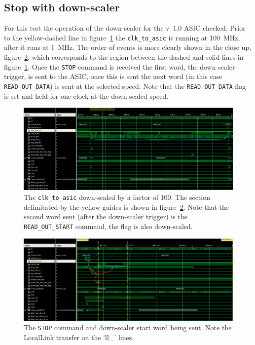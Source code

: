 \subsection{Stop with down-scaler} %
\label{sec:stop_downscaler}
For this test the operation of the down-scaler for the v~1.0 ASIC checked. Prior to the yellow-dashed line in figure~\ref{fig:isim_stop-downscaler} the \texttt{clk\_to\_asic} is running at 100~MHz, after it runs at 1~MHz. The order of events is more clearly shown in the close up, figure~\ref{fig:isim_stop-downscaler-zoom}, which corresponds to the region between the dashed and solid lines in figure~\ref{fig:isim_stop-downscaler}. Once the \texttt{STOP} command is received the first word, the down-scaler trigger, is sent to the ASIC, once this is sent the next word (in this case \texttt{READ\_OUT\_DATA}) is sent at the selected speed. Note that the \texttt{READ\_OUT\_DATA} flag is set and held for one clock at the down-scaled speed.

\begin{figure}
  \centering
  \includegraphics[width=\textwidth]{images/isim/edited/stop-downscaler.png}
  \caption{The \texttt{clk\_to\_asic} down-scaled by a factor of 100. The section delimitated by the yellow guides is shown in figure~\ref{fig:isim_stop-downscaler-zoom}. Note that the second word sent (after the down-scaler trigger) is the \texttt{READ\_OUT\_START} command, the flag is also down-scaled.}
  \label{fig:isim_stop-downscaler}
\end{figure}
    
\begin{figure}
  \centering  
  \includegraphics[width=\textwidth]{images/isim/edited/stop-downscaler-zoom.png}
  \caption{The \texttt{STOP} command and down-scaler start word being sent. Note the LocalLink transfer on the `ll\_' lines.}
  \label{fig:isim_stop-downscaler-zoom}
\end{figure}
\clearpage
